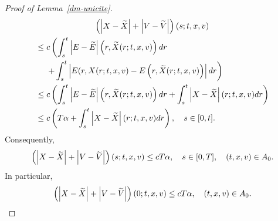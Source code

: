 \documentclass[10pt]{amsart}
\theoremstyle{definition}\newtheorem{defi}[theo]{Definition}\newtheorem{rema}[theo]{Remark}\newtheorem{exam}[theo]{Example}\newtheorem{exem}[theo]{Example}\newtheorem{nota}[theo]{Notation}
\let\oldtilde\tilde
\renewcommand*{\tilde}[1]{\mathchoice{\widetilde{#1}}{\widetilde{#1}}{\oldtilde{#1}}{\oldtilde{#1}}}
\begin{document}
\begin{proof}[{Proof of Lemma~\ref{dm-unicite}}]
\begin{multline*}
\left (\left|X-\tilde{X}\right| + \left|V-\tilde{V}\right| \right) (s;t,x,v) \\
\begin{aligned}
&\leq c \left(\int_s^t \left|E-\tilde{E}\right|\left(r,\tilde{X}(r;t,x,v)\right)dr\right.\\
&\quad\; \left.+ \int_s^t \left | E(r,X(r;t,x,v)-E\left(r,\tilde{X}(r;t,x,v)\right) \right| dr \right) \\
&\leq c \left(\int_s^t \left|E-\tilde{E}\right| \left(r,\tilde{X}(r;t,x,v)\right) dr + \int_s^t \left|X-\tilde{X}\right| (r;t,x,v) dr \right) \\
&\leq c \left(T\alpha + \int_s^t \left|X-\tilde{X}\right| (r;t,x,v) dr \right),\quad s\in [0,t].
\end{aligned}
\end{multline*}
Consequently,
\[
\left (\left|X-\tilde{X}\right| +\left|V-\tilde{V}\right| \right) (s;t,x,v) \leq cT\alpha, \quad s \in [0,T], \quad (t,x,v)\in A_0.
\]
In particular,
\begin{equation}\label{uniq-3}
\left (\left|X-\tilde{X}\right|+\left|V-\tilde{V}\right| \right)(0;t,x,v) \leq cT\alpha, \quad (t,x,v) \in A_0.
\end{equation}



\end{proof}
\end{document}
